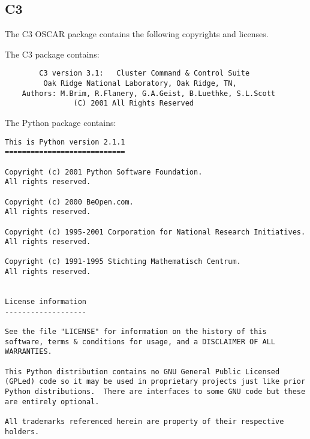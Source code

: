 %
%
%

\subsection{C3}
The C3 OSCAR package contains the following copyrights and licenses.

The C3 package contains:

\begin{verbatim}
        C3 version 3.1:   Cluster Command & Control Suite
         Oak Ridge National Laboratory, Oak Ridge, TN,
    Authors: M.Brim, R.Flanery, G.A.Geist, B.Luethke, S.L.Scott
                (C) 2001 All Rights Reserved
\end{verbatim}

The Python package contains:

\begin{verbatim}
This is Python version 2.1.1
============================

Copyright (c) 2001 Python Software Foundation.
All rights reserved.

Copyright (c) 2000 BeOpen.com.
All rights reserved.

Copyright (c) 1995-2001 Corporation for National Research Initiatives.
All rights reserved.

Copyright (c) 1991-1995 Stichting Mathematisch Centrum.
All rights reserved.


License information
-------------------

See the file "LICENSE" for information on the history of this
software, terms & conditions for usage, and a DISCLAIMER OF ALL
WARRANTIES.

This Python distribution contains no GNU General Public Licensed
(GPLed) code so it may be used in proprietary projects just like prior
Python distributions.  There are interfaces to some GNU code but these
are entirely optional.

All trademarks referenced herein are property of their respective
holders.
\end{verbatim}

